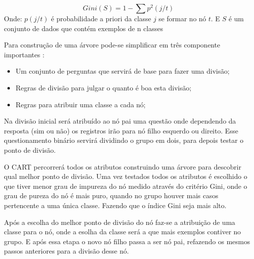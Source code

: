 \begin{equation}
Gini(S)= 1 - \sum p^2(j/t)
 \label{eq:cartGini}
\end{equation}
Onde: ${p(j/t)}$ é probabilidade a priori da classe ${j}$ se formar no nó ${t}$. E ${S}$ é um conjunto de dados que contém exemplos de n classes

Para construção de uma árvore pode-se simplificar em três componente importantes \cite{yohannes1999classification,Raimundo2008}: 
\begin{itemize}
[noitemsep]
 \item Um conjunto de perguntas que servirá de base para fazer uma divisão;
 \item Regras de divisão para julgar o quanto é boa esta divisão;
 \item Regras para atribuir uma classe a cada nó;
\end{itemize}

Na divisão inicial será atribuído ao nó pai uma questão onde dependendo da resposta (sim ou não) os registros irão para nó filho esquerdo ou direito. Esse questionamento binário servirá dividindo o grupo em dois, para depois testar o ponto de divisão.

O CART percorrerá todos os atributos construindo uma árvore para descobrir qual melhor ponto de divisão. Uma vez testados todos os atributos é escolhido o que tiver menor grau de impureza do nó medido através do critério Gini, onde o grau de pureza do nó é mais puro, quando no grupo houver mais casos pertencente a uma única classe. Fazendo que o índice Gini seja mais alto.

Após a escolha do melhor ponto de  divisão do nó faz-se a atribuição de uma classe para o nó, onde a esolha da classe será a que mais exemplos contiver no grupo. E após essa etapa o novo nó filho passa a ser nó pai, refazendo os mesmos passos anteriores para a divisão desse nó.





